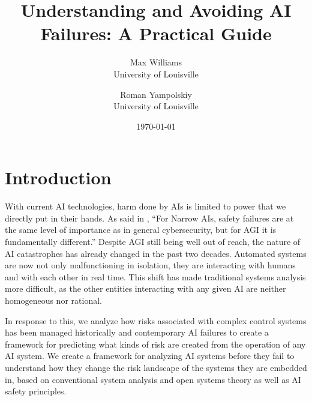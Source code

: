 \documentclass[11pt]{article}
\begin{document}
\title{Understanding and Avoiding AI Failures: A Practical Guide}
\author{Max Williams \\ University of Louisville \and Roman Yampolskiy \\ University of Louisville}
\date{\today}
\maketitle
\newpage

\tableofcontents
\newpage


\newpage

\newpage
\section{Introduction}
\label{sec:introduction}

With current AI technologies, harm done by AIs is limited to power that we directly put in their
hands.  As said in \cite{yam2018historic}, ``For Narrow AIs, safety failures are at the same level
of importance as in general cybersecurity, but for AGI it is fundamentally different.'' Despite AGI
still being well out of reach, the nature of AI catastrophes has already changed in the past two
decades. Automated systems are now not only malfunctioning in isolation, they are interacting with
humans and with each other in real time. This shift has made traditional systems analysis more
difficult, as the other entities interacting with any given AI are neither homogeneous nor rational.

In response to this, we analyze how risks associated with complex control systems has been managed
historically and contemporary AI failures to create a framework for predicting what kinds of risk
are created from the operation of any AI system. We create a framework for analyzing AI systems
before they fail to understand how they change the risk landscape of the systems they are embedded
in, based on conventional system analysis and open systems theory as well as AI safety principles.
\end{document}
